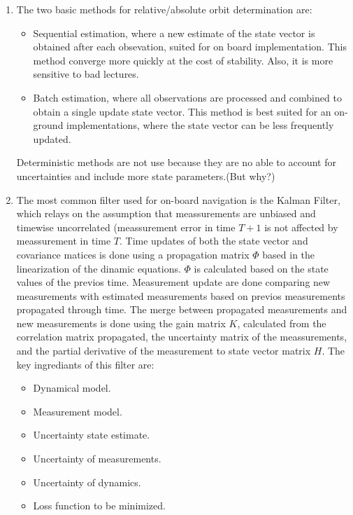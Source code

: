 \documentclass[a4paper]{article}
\begin{document}
\begin{enumerate}[label=\emph{\alph*)}]
  \item %
    The two basic methods for relative/absolute orbit determination are:
    \begin{itemize}
      \item Sequential estimation, where a new estimate of the state vector is obtained after each obsevation, suited for on board implementation. This method converge more quickly at the cost of stability. Also, it is more sensitive to bad lectures.
      \item Batch estimation, where all observations are processed and combined to obtain a single update state vector. This method is best suited for an on-ground implementations, where the state vector can be less frequently updated.
    \end{itemize}
  Deterministic methods are not use because they are no able to account for uncertainties and include more state parameters.(But why?)

  \item %
  The most common filter used for on-board navigation is the Kalman Filter, which relays on the assumption that meassurements are unbiased and timewise uncorrelated (meassurement error in time $T+1$ is not affected by meassurement in time $T$. Time updates of both the state vector and covariance matices is done using a propagation matrix $\Phi$ based in the linearization of the dinamic equations. $\Phi$ is calculated based on the state values of the previos time. Measurement update are done comparing new measurements with estimated measurements based on previos measurements propagated through time. The merge between propagated measurements and new measurements is done using the gain matrix $K$, calculated from the correlation matrix propagated, the uncertainty matrix of the meassurements, and the partial derivative of the measurement to state vector matrix $H$. The key ingrediants of this filter are:
    \begin{itemize}
      \item Dynamical model.
      \item Measurement model.
      \item Uncertainty state estimate.
      \item Uncertainty of measurements.
      \item Uncertainty of dynamics.
      \item Loss function to be minimized.
    \end{itemize}


\end{enumerate}
\end{document}

